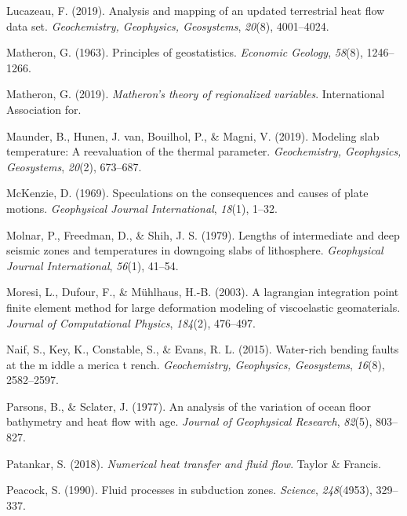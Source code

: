 \begin{CSLReferences}{1}{1}
\leavevmode{}%
Lucazeau, F. (2019). Analysis and mapping of an updated terrestrial heat flow data set. \emph{Geochemistry, Geophysics, Geosystems}, \emph{20}(8), 4001--4024.

\leavevmode{}%
Matheron, G. (1963). Principles of geostatistics. \emph{Economic Geology}, \emph{58}(8), 1246--1266.

\leavevmode{}%
Matheron, G. (2019). \emph{Matheron's theory of regionalized variables}. International Association for.

\leavevmode{}%
Maunder, B., Hunen, J. van, Bouilhol, P., \& Magni, V. (2019). Modeling slab temperature: A reevaluation of the thermal parameter. \emph{Geochemistry, Geophysics, Geosystems}, \emph{20}(2), 673--687.

\leavevmode{}%
McKenzie, D. (1969). Speculations on the consequences and causes of plate motions. \emph{Geophysical Journal International}, \emph{18}(1), 1--32.

\leavevmode{}%
Molnar, P., Freedman, D., \& Shih, J. S. (1979). Lengths of intermediate and deep seismic zones and temperatures in downgoing slabs of lithosphere. \emph{Geophysical Journal International}, \emph{56}(1), 41--54.

\leavevmode{}%
Moresi, L., Dufour, F., \& Mühlhaus, H.-B. (2003). A lagrangian integration point finite element method for large deformation modeling of viscoelastic geomaterials. \emph{Journal of Computational Physics}, \emph{184}(2), 476--497.

\leavevmode{}%
Naif, S., Key, K., Constable, S., \& Evans, R. L. (2015). Water-rich bending faults at the m iddle a merica t rench. \emph{Geochemistry, Geophysics, Geosystems}, \emph{16}(8), 2582--2597.

\leavevmode{}%
Parsons, B., \& Sclater, J. (1977). An analysis of the variation of ocean floor bathymetry and heat flow with age. \emph{Journal of Geophysical Research}, \emph{82}(5), 803--827.

\leavevmode{}%
Patankar, S. (2018). \emph{Numerical heat transfer and fluid flow}. Taylor \& Francis.

\leavevmode{}%
Peacock, S. (1990). Fluid processes in subduction zones. \emph{Science}, \emph{248}(4953), 329--337.


\end{CSLReferences}
